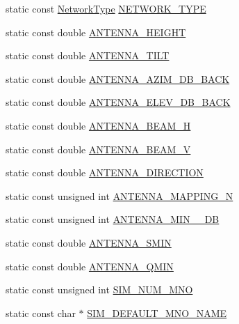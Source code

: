 \begin{DoxyCompactItemize}
\item 
static const \hyperlink{_network_type_8h_a3a159600500d5d7248be5bd1ca1f8d83}{Network\+Type} \hyperlink{class_constants_acdce90461fcc403b55fcbd846b32c3b8}{N\+E\+T\+W\+O\+R\+K\+\_\+\+T\+Y\+PE}
\item 
static const double \hyperlink{class_constants_adfe27efa61ae50b73c74b3f19c292625}{A\+N\+T\+E\+N\+N\+A\+\_\+\+H\+E\+I\+G\+HT}
\item 
static const double \hyperlink{class_constants_ad92a5c99071f0d843ee555e74c5f909a}{A\+N\+T\+E\+N\+N\+A\+\_\+\+T\+I\+LT}
\item 
static const double \hyperlink{class_constants_aa2030f2c0ec89fb7cc06b31bbb50793d}{A\+N\+T\+E\+N\+N\+A\+\_\+\+A\+Z\+I\+M\+\_\+\+D\+B\+\_\+\+B\+A\+CK}
\item 
static const double \hyperlink{class_constants_a8efdd6e1f2a25c24cb6dbff363e2d61a}{A\+N\+T\+E\+N\+N\+A\+\_\+\+E\+L\+E\+V\+\_\+\+D\+B\+\_\+\+B\+A\+CK}
\item 
static const double \hyperlink{class_constants_a4e4a0a48ad06c458ae4f3e6d0e4e6608}{A\+N\+T\+E\+N\+N\+A\+\_\+\+B\+E\+A\+M\+\_\+H}
\item 
static const double \hyperlink{class_constants_a2389355f6184d3b7903e154b46d069f5}{A\+N\+T\+E\+N\+N\+A\+\_\+\+B\+E\+A\+M\+\_\+V}
\item 
static const double \hyperlink{class_constants_ad82a10e13ae9e1cbce1cef616e47df31}{A\+N\+T\+E\+N\+N\+A\+\_\+\+D\+I\+R\+E\+C\+T\+I\+ON}
\item 
static const unsigned int \hyperlink{class_constants_a5db3a5bad9c514c994e71063dee2a798}{A\+N\+T\+E\+N\+N\+A\+\_\+\+M\+A\+P\+P\+I\+N\+G\+\_\+N}
\item 
static const unsigned int \hyperlink{class_constants_a2bda61c04e204f4a1279338fb790e1f4}{A\+N\+T\+E\+N\+N\+A\+\_\+\+M\+I\+N\+\_\+\_\+\+DB}
\item 
static const double \hyperlink{class_constants_af58b693e1ab4cdb1e83399eb0f2af647}{A\+N\+T\+E\+N\+N\+A\+\_\+\+S\+M\+IN}
\item 
static const double \hyperlink{class_constants_a9149aaac071422191e4417885fd42b07}{A\+N\+T\+E\+N\+N\+A\+\_\+\+Q\+M\+IN}
\item 
static const unsigned int \hyperlink{class_constants_a763bdd9401295d6b691c93cf580e562a}{S\+I\+M\+\_\+\+N\+U\+M\+\_\+\+M\+NO}
\item 
static const char $\ast$ \hyperlink{class_constants_a186cf83e20074a889823a7f36e50ad8c}{S\+I\+M\+\_\+\+D\+E\+F\+A\+U\+L\+T\+\_\+\+M\+N\+O\+\_\+\+N\+A\+ME}
\item 

\end{DoxyCompactItemize}
